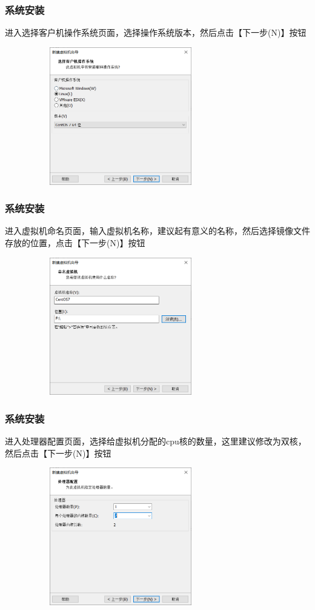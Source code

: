 \documentclass[notheorems,serif]{beamer}
\begin{document}
\begin{frame}
\frametitle{系统安装}
进入选择客户机操作系统页面，选择操作系统版本，然后点击【下一步(N)】按钮
\begin{figure}
\centering
\includegraphics[width=8cm,height=6cm]{./figures/图片12.png}
\end{figure}
\end{frame}

\begin{frame}
\frametitle{系统安装}
进入虚拟机命名页面，输入虚拟机名称，建议起有意义的名称，然后选择镜像文件存放的位置，点击【下一步(N)】按钮
\begin{figure}
\centering
\includegraphics[width=8cm,height=6cm]{./figures/图片13.png}
\end{figure}
\end{frame}

\begin{frame}
\frametitle{系统安装}
进入处理器配置页面，选择给虚拟机分配的cpu核的数量，这里建议修改为双核，然后点击【下一步(N)】按钮
\begin{figure}
\centering
\includegraphics[width=8cm,height=6cm]{./figures/图片14.png}
\end{figure}
\end{frame}
\end{document}

